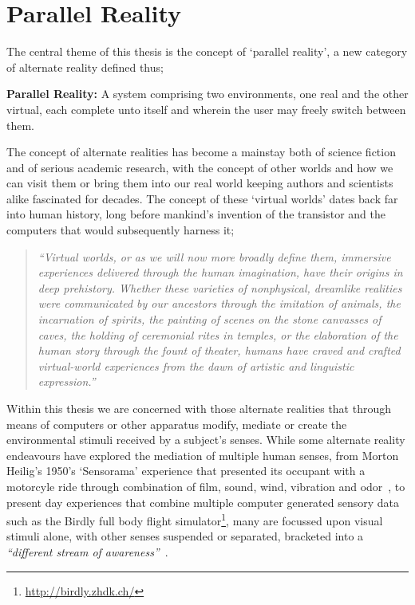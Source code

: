 
\section{Parallel Reality}
\label{intro-parallel-reality}
The central theme of this thesis is the concept of `parallel reality', a new category of alternate reality defined thus;

\vspace{7mm}

\textbf{Parallel Reality:} A system comprising two environments, one real and the other virtual, each complete unto itself and wherein the user may freely switch between them.

\vspace{7mm}


The concept of alternate realities has become a mainstay both of science fiction and of serious academic research, with the concept of other worlds and how we can visit them or bring them into our real world keeping authors and scientists alike fascinated for decades. The concept of these `virtual worlds' dates back far into human history, long before mankind's invention of the transistor and the computers that would subsequently harness it;

\begin{quote}
	\textit{``Virtual worlds, or as we will now more broadly define them, immersive experiences delivered through the human imagination, have their origins in deep prehistory. Whether these varieties of nonphysical, dreamlike realities were communicated by our ancestors through the imitation of animals, the incarnation of spirits, the painting of scenes on the stone canvasses of caves, the holding of ceremonial rites in temples, or the elaboration of the human story through the fount of theater, humans have craved and crafted virtual-world experiences from the dawn of artistic and linguistic expression.''}~\cite{Damer2014}
\end{quote}

Within this thesis we are concerned with those alternate realities that through means of computers or other apparatus modify, mediate or create the environmental stimuli received by a subject's senses. While some alternate reality endeavours have explored the mediation of multiple human senses, from Morton Heilig's 1950's `Sensorama' experience that presented its occupant with a motorcyle ride through combination of film, sound, wind, vibration and odor~\cite{Rheingold1992}, to present day experiences that combine multiple computer generated sensory data such as the Birdly full body flight simulator\footnote{\url{http://birdly.zhdk.ch/}}, many are focussed upon visual stimuli alone, with other senses suspended or separated, bracketed into a \textit{``different stream of awareness''}~\cite{Adams2014}.

